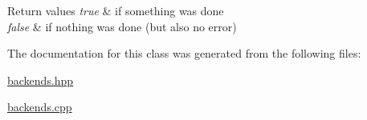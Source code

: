 \begin{DoxyRetVals}{Return values}
{\em true} & if something was done \\
\hline
{\em false} & if nothing was done (but also no error) \\
\hline
\end{DoxyRetVals}


The documentation for this class was generated from the following files\+:\begin{DoxyCompactItemize}
\item 
\hyperlink{backends_8hpp}{backends.\+hpp}\item 
\hyperlink{backends_8cpp}{backends.\+cpp}\end{DoxyCompactItemize}
